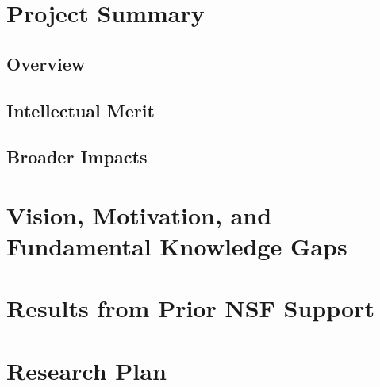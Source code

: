 \documentclass[11pt]{article}
\begin{document}
\section*{Project Summary}

\subsection*{Overview}

\subsection*{Intellectual Merit}

\subsection*{Broader Impacts}

\newpage

\section{Vision, Motivation, and Fundamental Knowledge Gaps}

\section{Results from Prior NSF Support}

\section{Research Plan}
\end{document}

